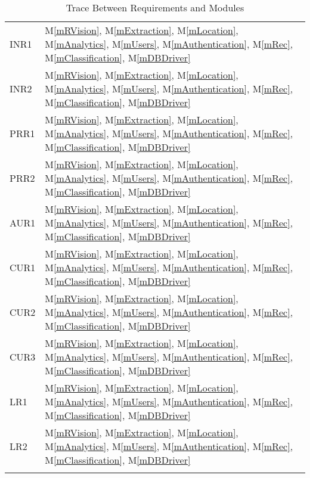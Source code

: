 \documentclass[12pt, titlepage]{article}
\newcommand{\mref}[1]{M\ref{#1}}
\begin{document}
\begin{longtable}{p{} p{}}
INR1 & \mref{mRVision}, \mref{mExtraction}, \mref{mLocation}, \mref{mAnalytics}, \mref{mUsers}, \mref{mAuthentication}, \mref{mRec}, \mref{mClassification}, \mref{mDBDriver}\\
INR2 & \mref{mRVision}, \mref{mExtraction}, \mref{mLocation}, \mref{mAnalytics}, \mref{mUsers}, \mref{mAuthentication}, \mref{mRec}, \mref{mClassification}, \mref{mDBDriver}\\
PRR1 & \mref{mRVision}, \mref{mExtraction}, \mref{mLocation}, \mref{mAnalytics}, \mref{mUsers}, \mref{mAuthentication}, \mref{mRec}, \mref{mClassification}, \mref{mDBDriver}\\
PRR2 & \mref{mRVision}, \mref{mExtraction}, \mref{mLocation}, \mref{mAnalytics}, \mref{mUsers}, \mref{mAuthentication}, \mref{mRec}, \mref{mClassification}, \mref{mDBDriver}\\
AUR1 & \mref{mRVision}, \mref{mExtraction}, \mref{mLocation}, \mref{mAnalytics}, \mref{mUsers}, \mref{mAuthentication}, \mref{mRec}, \mref{mClassification}, \mref{mDBDriver}\\
CUR1 & \mref{mRVision}, \mref{mExtraction}, \mref{mLocation}, \mref{mAnalytics}, \mref{mUsers}, \mref{mAuthentication}, \mref{mRec}, \mref{mClassification}, \mref{mDBDriver}\\
CUR2 & \mref{mRVision}, \mref{mExtraction}, \mref{mLocation}, \mref{mAnalytics}, \mref{mUsers}, \mref{mAuthentication}, \mref{mRec}, \mref{mClassification}, \mref{mDBDriver}\\
CUR3 & \mref{mRVision}, \mref{mExtraction}, \mref{mLocation}, \mref{mAnalytics}, \mref{mUsers}, \mref{mAuthentication}, \mref{mRec}, \mref{mClassification}, \mref{mDBDriver}\\
LR1 & \mref{mRVision}, \mref{mExtraction}, \mref{mLocation}, \mref{mAnalytics}, \mref{mUsers}, \mref{mAuthentication}, \mref{mRec}, \mref{mClassification}, \mref{mDBDriver}\\
LR2 & \mref{mRVision}, \mref{mExtraction}, \mref{mLocation}, \mref{mAnalytics}, \mref{mUsers}, \mref{mAuthentication}, \mref{mRec}, \mref{mClassification}, \mref{mDBDriver}\\
\bottomrule
\caption{Trace Between Requirements and Modules}
\label{TblRT}
\end{longtable}
\end{document}
